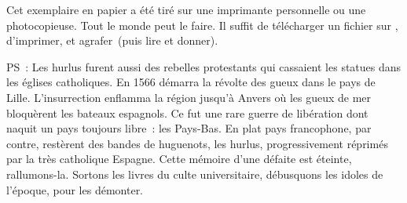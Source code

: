 \documentclass[french,twoside]{book} %
\begin{document}
  Cet exemplaire en papier a été tiré sur une imprimante personnelle
   ou une photocopieuse. Tout le monde peut le faire.
  Il suffit de
  télécharger un fichier sur \href{https://hurlus.fr}{},
  d’imprimer, et agrafer (puis lire et donner).\par

  \bigskip

  \noindent PS : Les hurlus furent aussi des rebelles protestants qui cassaient les statues dans les églises catholiques. En 1566 démarra la révolte des gueux dans le pays de Lille. L’insurrection enflamma la région jusqu’à Anvers où les gueux de mer bloquèrent les bateaux espagnols.
  Ce fut une rare guerre de libération dont naquit un pays toujours libre : les Pays-Bas.
  En plat pays francophone, par contre, restèrent des bandes de huguenots, les hurlus, progressivement réprimés par la très catholique Espagne.
  Cette mémoire d’une défaite est éteinte, rallumons-la. Sortons les livres du culte universitaire, débusquons les idoles de l’époque, pour les démonter.
\fi
\end{document}
